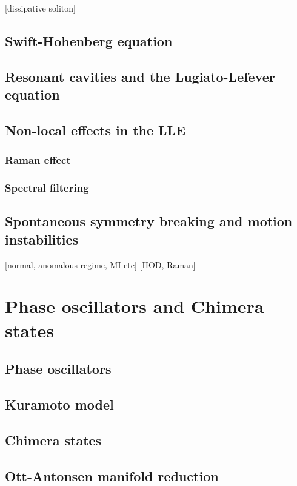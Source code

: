 [dissipative soliton]

\subsection{Swift-Hohenberg equation}

\subsection{Resonant cavities and the Lugiato-Lefever equation}

\subsection{Non-local effects in the LLE}
\subsubsection{Raman effect}
\subsubsection{Spectral filtering}

\subsection{Spontaneous symmetry breaking and motion instabilities}

[normal, anomalous regime, MI etc]
[HOD, Raman]

\section{Phase oscillators and Chimera states}
\subsection{Phase oscillators}
\label{sec:phase_oscillators}

\subsection{Kuramoto model}

\subsection{Chimera states}

\subsection{Ott-Antonsen manifold reduction}